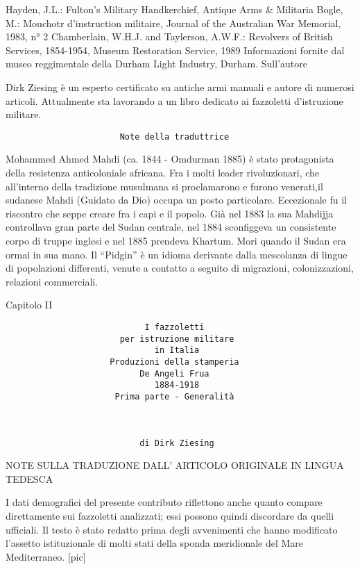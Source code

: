 Hayden, J.L.: Fulton's Military Handkerchief, Antique Arms \& Militaria
Bogle, M.: Mouchotr d'instruction militaire, Journal of the Australian
War Memorial, 1983, n° 2 Chamberlain, W.H.J. and Taylerson, A.W.F.:
Revolvers of British Services, 1854-1954, Museum Restoration Service,
1989 Informazioni fornite dal museo reggimentale della Durham Light
Industry, Durham. Sull'autore

Dirk Ziesing è un esperto certificato su antiche armi manuali e autore
di numerosi articoli. Attualmente sta lavorando a un libro dedicato ai
fazzoletti d'istruzione militare.

\begin{verbatim}
                       Note della traduttrice
\end{verbatim}

Mohammed Ahmed Mahdi (ca. 1844 - Omdurman 1885) è stato protagonista
della resistenza anticoloniale africana. Fra i molti leader
rivoluzionari, che all'interno della tradizione musulmana si
proclamarono e furono venerati,il sudanese Mahdi (Guidato da Dio) occupa
un posto particolare. Eccezionale fu il riscontro che seppe creare fra i
capi e il popolo. Già nel 1883 la sua Mahdijja controllava gran parte
del Sudan centrale, nel 1884 sconfiggeva un consistente corpo di truppe
inglesi e nel 1885 prendeva Khartum. Mori quando il Sudan era ormai in
sua mano. Il ``Pidgin'' è un idioma derivante dalla mescolanza di lingue
di popolazioni differenti, venute a contatto a seguito di migrazioni,
colonizzazioni, relazioni commerciali.

Capitolo II

\begin{verbatim}
                            I fazzoletti
                       per istruzione militare
                              in Italia
                     Produzioni della stamperia
                           De Angeli Frua
                              1884-1918
                      Prima parte - Generalità



                           di Dirk Ziesing
\end{verbatim}

NOTE SULLA TRADUZIONE DALL' ARTICOLO ORIGINALE IN LINGUA TEDESCA

I dati demografici del presente contributo riflettono anche quanto
compare direttamente sui fazzoletti analizzati; essi possono quindi
discordare da quelli ufficiali. Il testo è stato redatto prima degli
avvenimenti che hanno modificato l'assetto istituzionale di molti stati
della sponda meridionale del Mare Mediterraneo. {[}pic{]}

